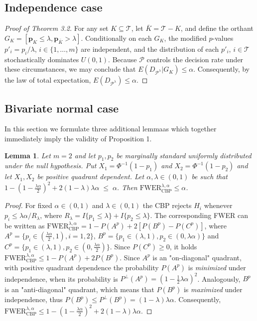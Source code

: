 \documentclass {imsart}
\newtheorem{lemma}{Lemma}
\renewcommand{\emph}[1]{\textsl{#1}}
\newcommand{\SUD}{$U(0,1)$\xspace}
\newcommand{\FWERcb}{\mathrm{FWER}_{\mathrm{CBP}}^{\lambda,\alpha}}
\renewcommand{\P}{\mathcal{P}}
\newcommand{\Plam}{\mathcal{P}^\lambda}
\def\mbf#1{\boldsymbol{#1}}                %
\begin{document}
\subsection{Independence case}
\begin{proof}[Proof of Theorem 3.2]
For any set $K \subseteq \mathcal{T}$, let $\bar K = \mathcal{T} - K$, and define the orthant ${G_K} = [{{\mbf{p}}_K}\leq\lambda,{{\mbf{p}}_{\bar K}} > \lambda ]$. Conditionally on each ${G_K}$, the modified $p$-values ${p'_i} = {p_i}/\lambda$, $i\in\{1,\ldots,m\}$ are independent, and the distribution of each ${p'_i}$, $i\in\mathcal{T}$ stochastically dominates \SUD. Because $\P$ controls the decision rate under these circumstances, we may conclude that $E(D_{\Plam}|G_K) \leq \alpha$. Consequently, by the law of total expectation, $E(D_{\Plam})\leq\alpha$.
\end{proof}


\subsection{Bivariate normal case}

In this section we formulate three additional lemmaas which together immediately imply the validity of Proposition 1.

\begin{lemma}
\label{lem.bivariate_PQD}
Let $m=2$ and let $p_1,p_2$ be marginally standard uniformly distributed under the null hypothesis. Put $X_1=\Phi^{-1}(1-p_1)$ and $X_2=\Phi^{-1}(1-p_2)$ and let $X_1,X_2$ be positive quadrant dependent. Let $\alpha,\lambda\in(0,1)$ be such that $1-(1-\tfrac{\lambda\alpha}{2})^2+2(1-\lambda)\lambda\alpha\;\leq\;\alpha$. Then $\FWERcb\leq\alpha$.
\end{lemma}

\begin{proof}
For fixed $\alpha\in(0,1)$ and $\lambda\in(0,1)$ the CBP rejects $H_i$ whenever $p_i\leq\lambda\alpha/R_\lambda$, where $R_\lambda=I\{p_1\leq\lambda\}+I\{p_2\leq\lambda\}$. The corresponding FWER can be written as $\FWERcb=1-P(A^p)+2[P(B^p)-P(C^p)]$, where $A^p=\{p_i\in(\tfrac{\lambda\alpha}{2},1),i=1,2\}$, $B^p=\{p_1\in(\lambda,1),p_2\in(0,\lambda\alpha)\}$ and $C^p=\{p_1\in(\lambda,1),p_2\in(0,\tfrac{\lambda\alpha}{2})\}$. Since $P(C^p)\geq0$, it holds $\FWERcb\leq1-P(A^p)+2P(B^p)$. Since $A^p$ is an "on-diagonal" quadrant, with positive quadrant dependence the probability $P(A^p)$ is \emph{minimized} under independence, when its probability is $P^\bot(A^p)=(1-\tfrac{1}{2}\lambda\alpha)^2$. Analogously, $B^p$ is an "anti-diagonal" quadrant, which means that $P(B^p)$ is \emph{maximized} under independence, thus $P(B^p)\leq{}P^\bot(B^p)=(1-\lambda)\lambda\alpha$. Consequently, $\FWERcb\leq1-(1-\tfrac{\lambda\alpha}{2})^2+2(1-\lambda)\lambda\alpha$.
\end{proof}
\end{document}
